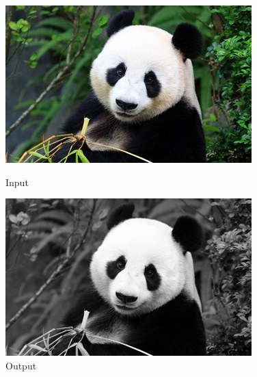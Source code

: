\documentclass[a4paper,8pt]{article}
\begin{document}
        \begin{figure}[H]
        \centering
        \begin{minipage}{0.4\linewidth}
        \centering
        \includegraphics[width=\linewidth]{output/input1.jpg}
        \caption{Input}
        \end{minipage}
        \hfill
        \begin{minipage}{0.4\linewidth}
        \centering
        \includegraphics[width=\linewidth]{output/Image Scaling_output.png}
        \caption{Output}
        \end{minipage}
        \end{figure}
        \clearpage
     
\end{document}
